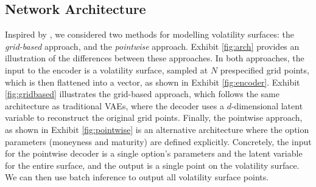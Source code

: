 \documentclass[12pt]{article}
\begin{document}
\subsection{Network Architecture}
Inspired by \citet{deep_rough_calibration}, we considered two methods for modelling volatility surfaces: the \textit{grid-based} approach, and the \textit{pointwise} approach. Exhibit \ref{fig:arch} provides an illustration of the differences between these approaches. In both approaches, the input to the encoder is a volatility surface, sampled at $N$ prespecified grid points, which is then flattened into a vector, as shown in Exhibit \ref{fig:encoder}. Exhibit \ref{fig:gridbased} illustrates the grid-based approach, which follows the same architecture as traditional VAEs, where the decoder uses a $d$-dimensional latent variable to reconstruct the original grid points. Finally, the pointwise approach, as shown in Exhibit \ref{fig:pointwise} is an alternative architecture where the option parameters (moneyness and maturity) are defined explicitly. Concretely, the input for the pointwise decoder is a single option's parameters and the latent variable for the entire surface, and the output is a single point on the volatility surface. We can  then use batch inference to output all volatility surface points. 

\end{document}
